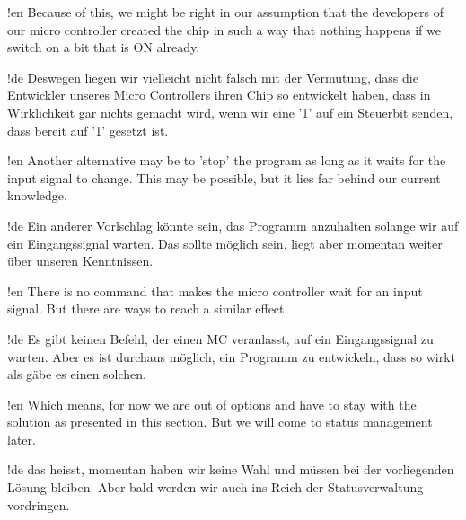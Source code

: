 !en Because of this, we might be right in our assumption that the developers of our \at micro controller created the chip in such a way that nothing happens if we switch on a bit that is ON already.

!de Deswegen liegen wir vielleicht nicht falsch mit der Vermutung, dass die Entwickler unseres \at Micro Controllers ihren Chip so entwickelt haben, dass in Wirklichkeit gar nichts gemacht wird, wenn wir eine '1' auf ein Steuerbit senden, dass bereit auf '1' gesetzt ist.



!en Another alternative may be to 'stop' the program as long as it waits for the input signal to change. This may be possible, but it lies far behind our current knowledge.

!de Ein anderer Vorlschlag könnte sein, das Programm anzuhalten solange wir auf ein Eingangssignal warten. Das sollte möglich sein, liegt aber momentan weiter über unseren Kenntnissen.



!en There is no command that makes the micro controller wait for an input signal. But there are ways to reach a similar effect.

!de Es gibt keinen Befehl, der einen MC veranlasst, auf ein Eingangssignal zu warten. Aber es ist durchaus möglich, ein Programm zu entwickeln, dass so wirkt als gäbe es einen solchen.



!en Which means, for now we are out of options and have to stay with the solution as presented in this section. But we will come to status management later.

!de das heisst, momentan haben wir keine Wahl und müssen bei der vorliegenden Lösung bleiben. Aber bald werden wir auch ins Reich der Statusverwaltung vordringen.
